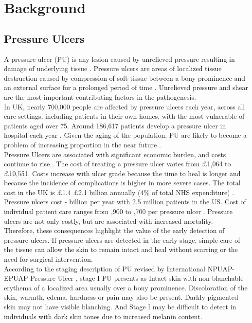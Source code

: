 \chapter{Background}
\section{Pressure Ulcers}
A pressure ulcer (PU) is any lesion caused by unrelieved pressure resulting in damage of underlying tissue \cite{Wikipedia}. Pressure ulcers are areas of localized tissue destruction caused by compression of soft tissue between a bony prominence and an external surface for a prolonged period of time \cite{Treatment}. Unrelieved pressure and shear are the most important contributing factors in the pathogenesis.\\

In UK, nearly 700,000 people are affected by pressure ulcers each year, across all care settings, including patients in their own homes, with the most vulnerable of patients aged over 75. Around 186,617 patients develop a pressure ulcer in hospital each year \cite{NHS}. Given the aging of the population, PU are likely to become a problem of increasing proportion in the near future \cite{Maklebust}.\\

Pressure Ulcers are associated with significant economic burden, and costs continue to rise \cite{Allman}. The cost of treating a pressure ulcer varies from \pounds 1,064 to \pounds 10,551. Costs increase with ulcer grade because the time to heal is longer and because the incidence of complications is higher in more severe cases. The total cost in the UK is \pounds 1.4 \- \pounds 2.1 billion annually (4\% of total NHS expenditure) \cite{Bennett}. Pressure ulcers cost  - billion per year with 2.5 million patients in the US. Cost of individual patient care ranges from ,900 to ,700 per pressure ulcer \cite{HumanService}. Pressure ulcers are not only costly, but are associated with increased mortality.\\

Therefore, these consequences highlight the value of the early detection of pressure ulcers. If pressure ulcers are detected in the early stage, simple care of the tissue can allow the skin to remain intact and heal without scarring or the need for surgical intervention. \\

According to the staging description of PU revised by International NPUAP- EPUAP Pressure Ulcer \cite{Epuap}, stage I PU presents as Intact skin with non-blanchable erythema of a localized area usually over a bony prominence. Discoloration of the skin, warmth, edema, hardness or pain may also be present. Darkly pigmented skin may not have visible blanching. And Stage I may be difficult to detect in individuals with dark skin tones due to increased melanin content. 

